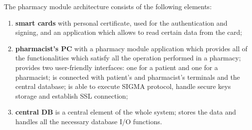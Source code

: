 The pharmacy module architecture consists of the following elements:
\begin{enumerate}
\item \textbf{smart cards} with personal certificate, used for the authentication and signing, and an application which allows to read certain data from the card;
\item \textbf{pharmacist's PC} with a pharmacy module application which provides all of the functionalities which satisfy all the operation performed in a pharmacy; provides two user-friendly interfaces: one for a patient and one for a pharmacist; is connected with patient’s and pharmacist’s terminals and the central database; is able to execute SIGMA protocol, handle secure keys storage and establish SSL connection;
\item{\textbf{central DB}} is a central element of the whole system; stores the data and handles all the necessary database I/O functions.
\end{enumerate}



